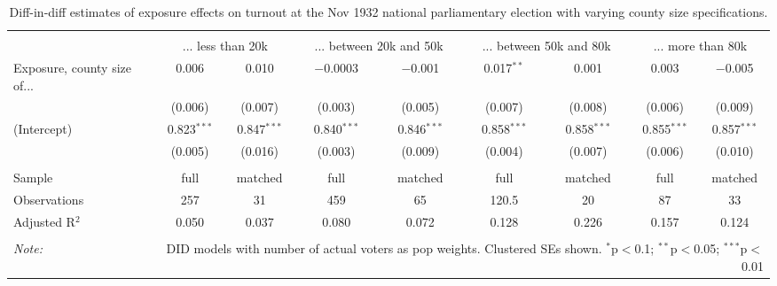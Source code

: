 
\begin{table}[!htbp] \centering 
  \caption{Diff-in-diff estimates of exposure effects on turnout at the Nov 1932 national parliamentary election with varying county size specifications.\vspace{-.25cm}} 
  \label{tab:turnout-countysize-dd-1932-2} 
\scriptsize 
\begin{tabular}{@{\extracolsep{5pt}}lcccccccc} 
\\[-1.8ex]\hline 
\hline \\[-1.8ex] 
 & \multicolumn{2}{c}{... less than 20k } & \multicolumn{2}{c}{... between 20k and 50k} & \multicolumn{2}{c}{... between 50k and 80k} & \multicolumn{2}{c}{... more than 80k} \\ 
 \cmidrule(r){2-3}\cmidrule(r){4-5}\cmidrule(r){6-7}\cmidrule(r){8-9}Exposure, county size of... & 0.006 & 0.010 & $-$0.0003 & $-$0.001 & 0.017$^{**}$ & 0.001 & 0.003 & $-$0.005 \\ 
  & (0.006) & (0.007) & (0.003) & (0.005) & (0.007) & (0.008) & (0.006) & (0.009) \\ 
  (Intercept) & 0.823$^{***}$ & 0.847$^{***}$ & 0.840$^{***}$ & 0.846$^{***}$ & 0.858$^{***}$ & 0.858$^{***}$ & 0.855$^{***}$ & 0.857$^{***}$ \\ 
  & (0.005) & (0.016) & (0.003) & (0.009) & (0.004) & (0.007) & (0.006) & (0.010) \\ 
 \hline \\[-1.8ex] 
Sample & full & matched & full & matched & full & matched & full & matched \\ 
Observations & 257 & 31 & 459 & 65 & 120.5 & 20 & 87 & 33 \\ 
Adjusted R$^{2}$ & 0.050 & 0.037 & 0.080 & 0.072 & 0.128 & 0.226 & 0.157 & 0.124 \\ 
\hline 
\hline \\[-1.8ex] 
\textit{Note:}  & \multicolumn{8}{r}{DID models with number of actual voters as pop weights. Clustered SEs shown. $^{*}$p$<$0.1; $^{**}$p$<$0.05; $^{***}$p$<$0.01} \\ 
\end{tabular} 
\end{table} 
